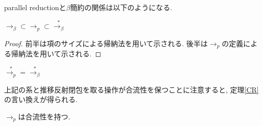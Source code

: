 \documentclass{ltjsarticle}
\begin{document}
parallel reductionと$\beta$簡約の関係は以下のようになる.

\begin{lem}
 $\rightarrow_{\beta} \subset \rightarrow_{p} \subset \overset{*}{\rightarrow_{\beta}}$
\end{lem}

\begin{proof}
 前半は項のサイズによる帰納法を用いて示される. 後半は$\rightarrow_{p}$の定義による帰納法を用いて示される.
\end{proof}

\begin{cor}
 $\overset{*}{\rightarrow_{p}} = \overset{*}{\rightarrow_{\beta}}$
\end{cor}

上記の系と推移反射閉包を取る操作が合流性を保つことに注意すると, 定理\ref{CR}の言い換えが得られる.

\begin{thm}\label{CR'}
 $\rightarrow_{p}$は合流性を持つ.
\end{thm}
\end{document}
